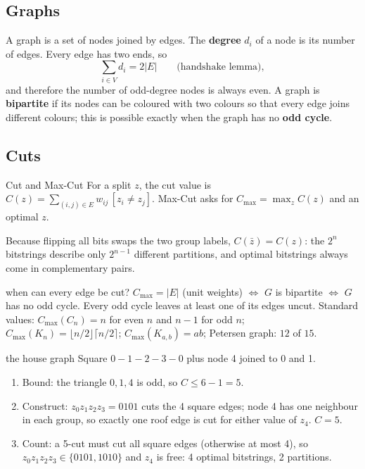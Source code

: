 \documentclass[11pt,a4paper,openany]{book}
\newcounter{wex}[chapter]
\newenvironment{steps}{\begin{enumerate}[label=\textbf{Step \arabic*.}, leftmargin=4.2em, itemsep=2pt]}{\end{enumerate}}
\begin{document}
\subsection{Graphs}
A graph is a set of nodes joined by edges. The \textbf{degree} $d_i$ of a node is its number of edges. Every edge has two ends,
so
\[ \sum_{i\in V} d_i = 2|E| \qquad\text{(handshake lemma)}, \]
and therefore the number of odd-degree nodes is always even. A graph is \textbf{bipartite} if its nodes can be coloured with
two colours so that every edge joins different colours; this is possible exactly when the graph has no \textbf{odd cycle}.

\subsection{Cuts}
\begin{defn}{Cut and Max-Cut}
For a split $z$, the cut value is $C(z) = \sum_{(i,j)\in E} w_{ij}\,[z_i \neq z_j]$. Max-Cut asks for
$C_{\max} = \max_z C(z)$ and an optimal $z$.
\end{defn}
Because flipping all bits swaps the two group labels, $C(\bar z) = C(z)$: the $2^n$ bitstrings describe only $2^{n-1}$ different
partitions, and optimal bitstrings always come in complementary pairs.

\begin{keyres}{when can every edge be cut?}
$C_{\max} = |E|$ (unit weights) $\iff$ $G$ is bipartite $\iff$ $G$ has no odd cycle. Every odd cycle leaves at least one of its
edges uncut. Standard values: $C_{\max}(C_n) = n$ for even $n$ and $n - 1$ for odd $n$; $C_{\max}(K_n) = \lfloor n/2\rfloor\lceil n/2\rceil$;
$C_{\max}(K_{a,b}) = ab$; Petersen graph: $12$ of $15$.
\end{keyres}

\begin{wexample}{the house graph}
Square $0{-}1{-}2{-}3{-}0$ plus node 4 joined to 0 and 1.
\begin{steps}
\item Bound: the triangle $0, 1, 4$ is odd, so $C \le 6 - 1 = 5$.
\item Construct: $z_0z_1z_2z_3 = 0101$ cuts the 4 square edges; node 4 has one neighbour in each group, so exactly one roof edge is
cut for either value of $z_4$. $C = 5$.
\item Count: a 5-cut must cut all square edges (otherwise at most 4), so $z_0z_1z_2z_3 \in \{0101, 1010\}$ and $z_4$ is free:
4 optimal bitstrings, 2 partitions.
\end{steps}
\end{wexample}
\end{document}
